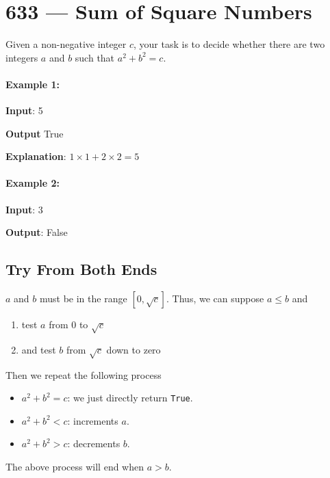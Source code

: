 \section{633 --- Sum of Square Numbers}
Given a non-negative integer $c$, your task is to decide whether there are two integers $a$ and $b$ such that $a^2 + b^2 = c$.

\paragraph{Example 1:}

\begin{flushleft}
\textbf{Input}: 5

\textbf{Output} True

\textbf{Explanation}: $1 \times 1 + 2 \times 2 = 5$

\end{flushleft}
 

\paragraph{Example 2:}

\begin{flushleft}
\textbf{Input}: 3

\textbf{Output}: False

\end{flushleft}

\subsection{Try From Both Ends}
$a$ and $b$ must be in the range $[0, \sqrt{c}]$. Thus, we can suppose $a\leq b$ and
\begin{enumerate}
\item test $a$ from 0 to $\sqrt{c}$
\item and test $b$ from $\sqrt{c}$ down to zero
\end{enumerate}

Then we repeat the following process

\begin{itemize}
\item $a^2+b^2=c$: we just directly return \texttt{True}. 

\item $a^2+b^2<c$: increments $a$.

\item $a^2+b^2>c$: decrements $b$.

\end{itemize}
The above process will end when $a > b$.

